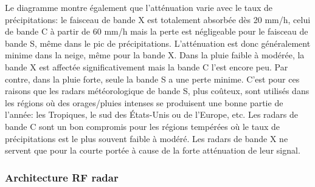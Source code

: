 Le diagramme montre également que l’atténuation varie avec le taux de précipitations: le faisceau de bande X est totalement absorbée dès 20 mm/h, celui de bande C à partir de 60 mm/h mais la perte est négligeable pour le faisceau de bande S, même dans le pic de précipitations.
L’atténuation est donc généralement minime dans la neige, même pour la bande X. Dans la pluie faible à modérée, la bande X est affectée significativement mais la bande C l’est encore peu. Par contre, dans la pluie forte, seule la bande S a une perte minime. C’est pour ces raisons que les radars météorologique de bande S, plus coûteux, sont utilisés dans les régions où des orages/pluies intenses se produisent une bonne partie de l’année: les Tropiques, le sud des États-Unis ou de l’Europe, etc. Les radars de bande C sont un bon compromis pour les régions tempérées où le taux de précipitations est le plus souvent faible à modéré. Les radars de bande X ne servent que pour la courte portée à cause de la forte atténuation de leur signal. \cite{radartutorial}

\subsubsection{Architecture RF radar}

